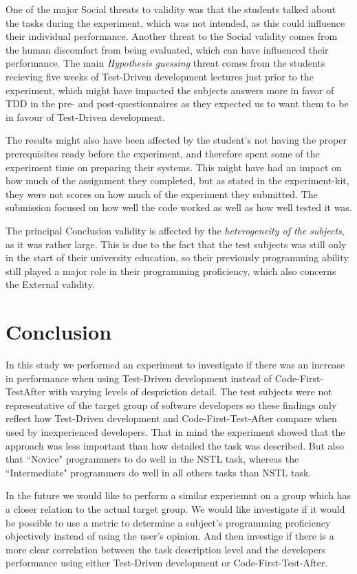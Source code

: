 \documentclass{sig-alternate-05-2015}
\begin{document}
One of the major Social threats to validity was that the students talked about the tasks during the experiment, which was not intended, as this could influence their individual performance. Another threat to the Social validity comes from the human discomfort from being evaluated\cite{henchy1}, which can have influenced their performance. The main \textit{Hypothesis guessing} threat comes from the students recieving five weeks of Test-Driven development lectures just prior to the experiment, which might have impacted the subjects answers more in favor of TDD in the pre- and post-questionnaires as they expected us to want them to be in favour of Test-Driven development. 

The results might also have been affected by the student's not having the proper prerequisites ready before the experiment, and therefore spent some of the experiment time on preparing their systems. This might have had an impact on how much of the assignment they completed, but as stated in the experiment-kit, they were not scores on how much of the experiment they submitted. The submission focused on how well the code worked as well as how well tested it was.

The principal Conclusion validity is affected by the \textit{heterogeneity of the subjects}, as it was rather large. This is due to the fact that the test subjects was still only in the start of their university education, so their previously programming ability still played a major role in their programming proficiency, which also concerns the External validity. 

\section{Conclusion}
\label{sec:Conclusion}
In this study we performed an experiment to investigate if there was an increase in performance when using Test-Driven development instead of Code-First-TestAfter with varying levels of despriction detail. The test subjects were not representative of the target group of software developers so these findings only reflect how Test-Driven development and Code-First-Test-After compare when used by inexperienced developers. That in mind the experiment showed that the approach was less important than how detailed the task was described. But also that ``Novice" programmers to do well in the NSTL task, whereas the ``Intermediate" programmers do well in all others tasks than NSTL task.

In the future we would like to perform a similar experiemnt on a group which has a closer relation to the actual target group. We would like investigate if it would be possible to use a metric to determine a subject's programming proficiency objectively instead of using the user's opinion. And then investige if there is a more clear correlation between the task description level and the developers performance using either Test-Driven development or Code-First-Test-After.
\end{document}

